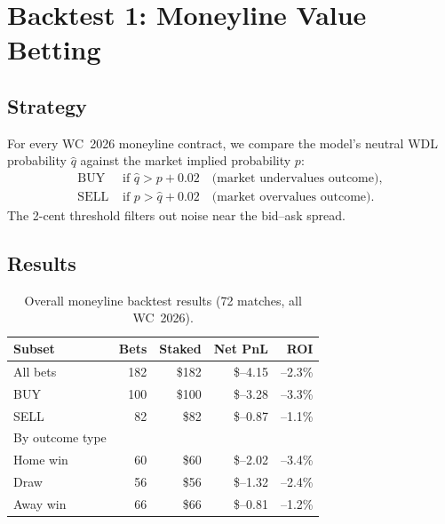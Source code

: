 \documentclass[11pt, a4paper]{article}
\begin{document}
\bigskip

\section{Backtest 1: Moneyline Value Betting}

\subsection{Strategy}

For every WC~2026 moneyline contract, we compare the model's neutral
WDL probability $\hat{q}$ against the market implied probability $p$:
\begin{align*}
  \text{BUY}  &\text{ if } \hat{q} > p + 0.02 \quad \text{(market undervalues outcome)},\\
  \text{SELL} &\text{ if } p > \hat{q} + 0.02 \quad \text{(market overvalues outcome)}.
\end{align*}
The 2-cent threshold filters out noise near the bid--ask spread.

\subsection{Results}

\begin{table}[h!]
\centering
\caption{Overall moneyline backtest results (72 matches, all WC~2026).}
\begin{tabular}{lrrrr}
\toprule
Subset & Bets & Staked & Net PnL & ROI \\
\midrule
All bets  & 182 & \$182 & \$--4.15 & --2.3\% \\
\quad BUY  & 100 & \$100 & \$--3.28 & --3.3\% \\
\quad SELL &  82 & \$82  & \$--0.87 & --1.1\% \\
\midrule
By outcome type & & & & \\
\quad Home win &  60 & \$60 & \$--2.02 & --3.4\% \\
\quad Draw     &  56 & \$56 & \$--1.32 & --2.4\% \\
\quad Away win &  66 & \$66 & \$--0.81 & --1.2\% \\
\bottomrule
\end{tabular}
\end{table}
\end{document}
